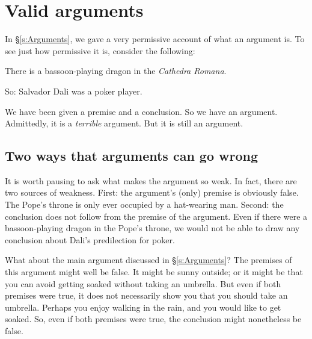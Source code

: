 \chapter{Valid arguments}\label{s:Valid}
In \S\ref{s:Arguments}, we gave a very permissive account of what an argument is. To see just how permissive it is, consider the following:
	\begin{earg}
		\item[] There is a bassoon-playing dragon in the \emph{Cathedra Romana}.
		\item[So:] Salvador Dali was a poker player.
	\end{earg}
We have been given a premise and a conclusion. So we have an argument. Admittedly, it is a \emph{terrible} argument. But it is still an argument.

\section{Two ways that arguments can go wrong}

It is worth pausing to ask what makes the argument so weak. In fact, there are two sources of weakness. First: the argument's (only) premise is obviously false. The Pope's throne is only ever occupied by a hat-wearing man. Second: the conclusion does not follow from the premise of the argument. Even if there were a bassoon-playing dragon in the Pope's throne, we would not be able to draw any conclusion about Dali's predilection for poker.

What about the main argument discussed in \S\ref{s:Arguments}? The premises of this argument might well be false. It might be sunny outside; or it might be that you can avoid getting soaked without taking an umbrella. But even if both premises were true, it does not necessarily show you that you should take an umbrella. Perhaps you enjoy walking in the rain, and you would like to get soaked. So, even if both premises were true, the conclusion might nonetheless be false.

